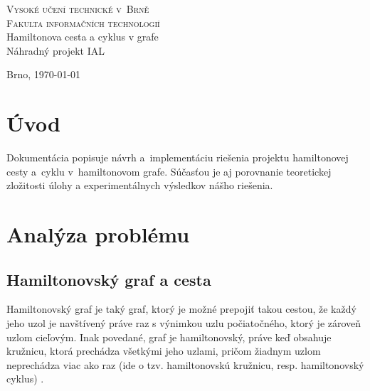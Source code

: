 \documentclass[a4paper,11pt, titlepage]{article}
\begin{document}
\begin{titlepage}
	
	\begin{center}
		{\Huge\textsc{Vysoké učení technické v~Brně}}\\
		\medskip
		{\huge\textsc{Fakulta informačních technologií}}\\
		{\huge Hamiltonova cesta a cyklus v grafe}\\
		\medskip
		{\LARGE Náhradný projekt IAL}\\
	\end{center}
	
		
	
	
	\Large {\hfill Brno, \today}
	
\end{titlepage}

\section{Úvod}

Dokumentácia popisuje návrh a~implementáciu riešenia projektu hamiltonovej cesty a~cyklu v~hamiltonovom grafe. Súčasťou je aj porovnanie teoretickej zložitosti úlohy a experimentálnych výsledkov nášho riešenia.

\section{Analýza problému}

\subsection{Hamiltonovský graf a cesta}

Hamiltonovský graf \cite{Wikipedia_Hamilton_Path} je taký graf, ktorý je možné prepojiť takou cestou, že každý jeho uzol je navštívený práve raz s výnimkou uzlu počiatočného, ktorý je zároveň uzlom cieľovým. Inak povedané, graf je hamiltonovský, práve keď obsahuje kružnicu, ktorá prechádza všetkými jeho uzlami, pričom žiadnym uzlom neprechádza viac ako raz (ide o tzv. hamiltonovskú kružnicu, resp. hamiltonovský cyklus) \cite{Studijni_opora}.
\end{document}
